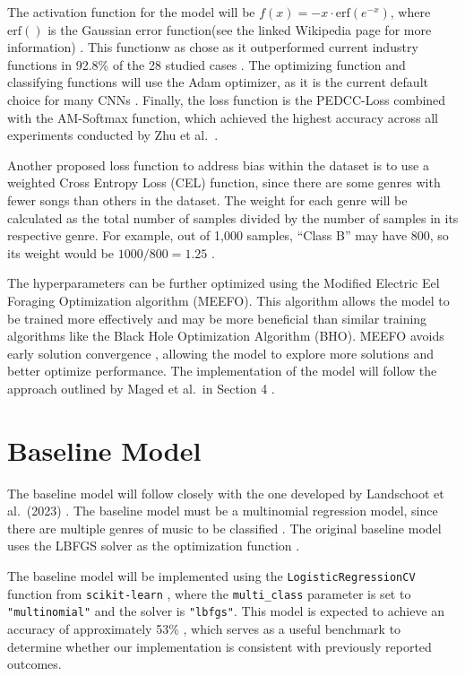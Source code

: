 \documentclass{article} %
\begin{document}
The activation function for the model will be \( f(x) = -x \cdot \mathrm{erf}(e^{-x}) \), where \(\mathrm{erf}()\) is the Gaussian error function(see the linked Wikipedia page for more information) \citep{wikipedia_error_function}. This functionw as chose as it  outperformed current industry functions in 92.8\% of the 28 studied cases \citep{RAHMAN2024112502}. The optimizing function and classifying functions will use the Adam optimizer, as it is the current default choice for many CNNs \citep{rafalski2025cnnopt}. Finally, the loss function is the PEDCC-Loss combined with the AM-Softmax function, which achieved the highest accuracy across all experiments conducted by Zhu et al.\ \citep{DBLP:journals/corr/abs-1904-06008}.

Another proposed loss function to address bias within the dataset is to use a weighted Cross Entropy Loss (CEL) function, since there are some genres with fewer songs than others in the dataset. The weight for each genre will be calculated as the total number of samples divided by the number of samples in its respective genre. For example, out of 1,000 samples, “Class B” may have 800, so its weight would be \(1000 / 800 = 1.25\) \citep{tantai_weighted}.

The hyperparameters can be further optimized using the Modified Electric Eel Foraging Optimization algorithm (MEEFO). This algorithm allows the model to be trained more effectively and may be more beneficial than similar training algorithms like the Black Hole Optimization Algorithm (BHO). MEEFO avoids early solution convergence \citep{zhang2025zfnet}, allowing the model to explore more solutions and better optimize performance. The implementation of the model will follow the approach outlined by Maged et al.\ in Section 4 \citep{MAGED2024102855}.



\section{Baseline Model}

The baseline model will follow closely with the one developed by Landschoot et al.\ (2023) \citep{landschoot2020github}. The baseline model must be a multinomial regression model, since there are multiple genres of music to be classified \citep{jesussek2023logistic}. The original baseline model uses the LBFGS solver as the optimization function \citep{landschoot2020github}. 

The baseline model will be implemented using the \texttt{LogisticRegressionCV} function from \texttt{scikit-learn} \citep{scikit_learn_website}, where the \texttt{multi\_class} parameter is set to \texttt{"multinomial"} and the solver is \texttt{"lbfgs"}. This model is expected to achieve an accuracy of approximately 53\% \citep{landschoot2020github}, which serves as a useful benchmark to determine whether our implementation is consistent with previously reported outcomes.
\end{document}
